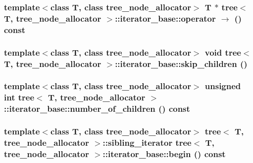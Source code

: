 \hypertarget{classtree_1_1iterator__base_bd9c59569df7d8be5a50c835c180f4dc}{
\subsubsection{\setlength{\rightskip}{0pt plus 5cm}template$<$class T, class tree\_\-node\_\-allocator$>$ T $\ast$ {\bf tree}$<$ T, tree\_\-node\_\-allocator $>$::iterator\_\-base::operator $\rightarrow$  () const}}
\label{classtree_1_1iterator__base_bd9c59569df7d8be5a50c835c180f4dc}


\hypertarget{classtree_1_1iterator__base_a0be7989b9dd4c5bcdcc0d47a56d11fb}{
\subsubsection{\setlength{\rightskip}{0pt plus 5cm}template$<$class T, class tree\_\-node\_\-allocator$>$ void {\bf tree}$<$ T, tree\_\-node\_\-allocator $>$::iterator\_\-base::skip\_\-children ()}}
\label{classtree_1_1iterator__base_a0be7989b9dd4c5bcdcc0d47a56d11fb}


\hypertarget{classtree_1_1iterator__base_435004214270928d106dd4c8f6a36f17}{
\subsubsection{\setlength{\rightskip}{0pt plus 5cm}template$<$class T, class tree\_\-node\_\-allocator$>$ unsigned int {\bf tree}$<$ T, tree\_\-node\_\-allocator $>$::iterator\_\-base::number\_\-of\_\-children () const}}
\label{classtree_1_1iterator__base_435004214270928d106dd4c8f6a36f17}


\hypertarget{classtree_1_1iterator__base_7fad2f6cc1a6a667b5c71bb16c9b84e5}{
\subsubsection{\setlength{\rightskip}{0pt plus 5cm}template$<$class T, class tree\_\-node\_\-allocator$>$ {\bf tree}$<$ T, tree\_\-node\_\-allocator $>$::{\bf sibling\_\-iterator} {\bf tree}$<$ T, tree\_\-node\_\-allocator $>$::iterator\_\-base::begin () const}}
\label{classtree_1_1iterator__base_7fad2f6cc1a6a667b5c71bb16c9b84e5}



